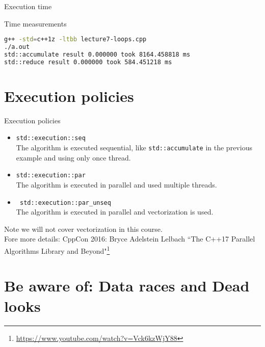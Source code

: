 \documentclass[12pt,t]{beamer}
\begin{document}
\begin{frame}[fragile]{Execution time}

\begin{block}{Time measurements}
\begin{lstlisting}[language=bash]
g++ -std=c++1z -ltbb lecture7-loops.cpp 
./a.out
std::accumulate result 0.000000 took 8164.458818 ms
std::reduce result 0.000000 took 584.451218 ms
\end{lstlisting}


\end{block}


\end{frame}

\section{Execution policies}


\begin{frame}{Execution policies}

\begin{itemize}
\item \lstinline|std::execution::seq| \\
The algorithm is executed sequential, like \lstinline|std::accumulate| in the previous example and using only once thread.
\item \lstinline|std::execution::par| \\
The algorithm is executed in parallel and used multiple threads.
\item \lstinline| std::execution::par_unseq| \\
The algorithm is executed in parallel and vectorization is used.
\end{itemize}
Note we will not cover vectorization in this course. \\
\vspace{0.5cm}
Fore more details: CppCon 2016: Bryce Adelstein Lelbach “The C++17 Parallel Algorithms Library and Beyond"\footnote{\tiny{\url{https://www.youtube.com/watch?v=Vck6kzWjY88}}}
\end{frame}


\section{Be aware of: Data races and Dead looks}
\end{document}

